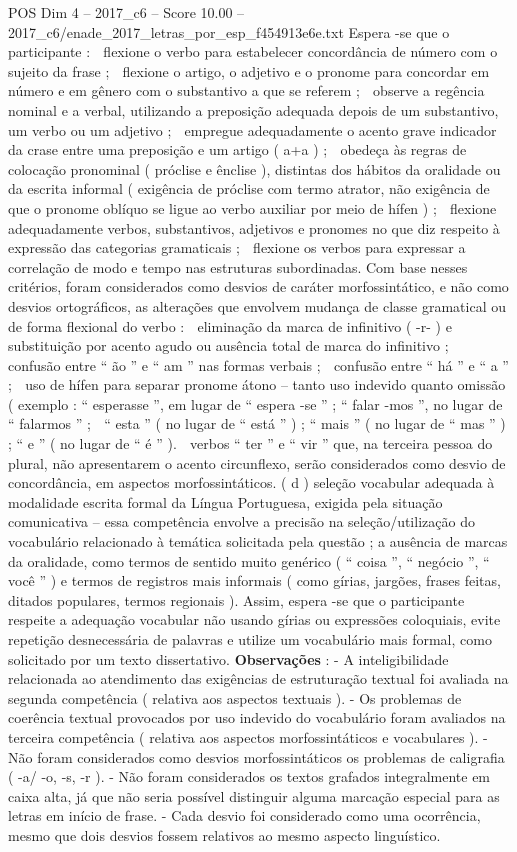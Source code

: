 \begin{textsample}{POS Dim 4 – 2017\_c6 – Score 10.00 – 2017\_c6/enade\_2017\_letras\_por\_esp\_f454913e6e.txt}
Espera -se que o participante :  flexione o verbo para estabelecer concordância de número com o sujeito da frase ;  flexione o artigo, o adjetivo e o pronome para concordar em número e em gênero com o substantivo a que se referem ;  observe a regência nominal e a verbal, utilizando a preposição adequada depois de um substantivo, um verbo ou um adjetivo ;  empregue adequadamente o acento grave indicador da crase entre uma preposição e um artigo ( a+a ) ;  obedeça às regras de colocação pronominal ( próclise e ênclise ), distintas dos hábitos da oralidade ou da escrita informal ( exigência de próclise com termo atrator, não exigência de que o pronome oblíquo se ligue ao verbo auxiliar por meio de hífen ) ;  flexione adequadamente verbos, substantivos, adjetivos e pronomes no que diz respeito à expressão das categorias gramaticais ;  flexione os verbos para expressar a correlação de modo e tempo nas estruturas subordinadas.
Com base nesses critérios, foram considerados como desvios de caráter morfossintático, e não como desvios ortográficos, as alterações que envolvem mudança de classe gramatical ou de forma flexional do verbo :  eliminação da marca de infinitivo ( -r- ) e substituição por acento agudo ou ausência total de marca do infinitivo ;  confusão entre “ ão ” e “ am ” nas formas verbais ;  confusão entre “ há ” e “ a ” ;  uso de hífen para separar pronome átono – tanto uso indevido quanto omissão ( exemplo : “ esperasse ”, em lugar de “ espera -se ” ; “ falar -mos ”, no lugar de “ falarmos ” ;  “ esta ” ( no lugar de “ está ” ) ; “ mais ” ( no lugar de “ mas ” ) ; “ e ” ( no lugar de “ é ” ).  verbos “ ter ” e “ vir ” que, na terceira pessoa do plural, não apresentarem o acento circunflexo, serão considerados como desvio de concordância, em aspectos morfossintáticos. ( d ) seleção vocabular adequada à modalidade escrita formal da Língua Portuguesa, exigida pela situação comunicativa – essa competência envolve a precisão na seleção/utilização do vocabulário relacionado à temática solicitada pela questão ; a ausência de marcas da oralidade, como termos de sentido muito genérico ( “ coisa ”, “ negócio ”, “ você ” ) e termos de registros mais informais ( como gírias, jargões, frases feitas, ditados populares, termos regionais ).
Assim, espera -se que o participante respeite a adequação vocabular não usando gírias ou expressões coloquiais, evite repetição desnecessária de palavras e utilize um vocabulário mais formal, como solicitado por um texto dissertativo. \textbf{Observações} : - A inteligibilidade relacionada ao atendimento das exigências de estruturação textual foi avaliada na segunda competência ( relativa aos aspectos textuais ). - Os problemas de coerência textual provocados por uso indevido do vocabulário foram avaliados na terceira competência ( relativa aos aspectos morfossintáticos e vocabulares ). - Não foram considerados como desvios morfossintáticos os problemas de caligrafia ( -a/ -o, -s, -r ). - Não foram considerados os textos grafados integralmente em caixa alta, já que não seria possível distinguir alguma marcação especial para as letras em início de frase. - Cada desvio foi considerado como uma ocorrência, mesmo que dois desvios fossem relativos ao mesmo aspecto linguístico.

\end{textsample}
